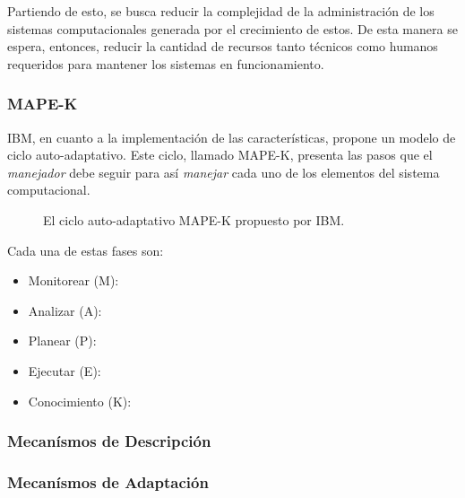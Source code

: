 \documentclass[12pt]{article}
\begin{document}
    Partiendo de esto, se busca reducir la complejidad de la administración de los sistemas computacionales generada por el crecimiento de estos. De esta manera se espera, entonces, reducir la cantidad de recursos tanto técnicos como humanos requeridos para mantener los sistemas en funcionamiento.
    
    \subsubsection{MAPE-K}


    IBM, en cuanto a la implementación de las características, propone un modelo de ciclo auto-adaptativo. Este ciclo, llamado MAPE-K, presenta las pasos que el \textit{manejador} debe seguir para así \textit{manejar} cada uno de los elementos del sistema computacional. 

    \begin{figure}[H]
        \centering
        
        \caption{El ciclo auto-adaptativo MAPE-K propuesto por IBM. } \cite{alessandra_2010}
        \label{ig:mapek}
    \end{figure}

    Cada una de estas fases son:

    \begin{itemize}
        \item Monitorear (M): 
        \item Analizar (A):
        \item Planear (P):
        \item Ejecutar (E): 
        \item Conocimiento (K):
    \end{itemize}

    \subsubsection{Mecanísmos de Descripción}


    \subsubsection{Mecanísmos de Adaptación}
    
\end{document}
